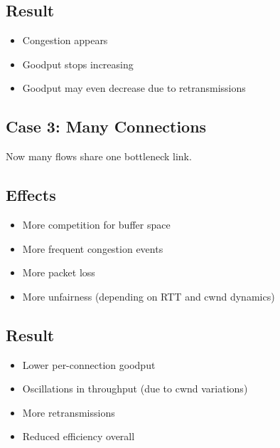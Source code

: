 \subsection*{Result}
\begin{itemize}
    \item Congestion appears
    \item Goodput stops increasing
    \item Goodput may even decrease due to retransmissions
\end{itemize}

\subsection{Case 3: Many Connections}

Now many flows share one bottleneck link.

\subsection*{Effects}
\begin{itemize}
    \item More competition for buffer space
    \item More frequent congestion events
    \item More packet loss
    \item More unfairness (depending on RTT and cwnd dynamics)
\end{itemize}

\subsection*{Result}
\begin{itemize}
    \item Lower per-connection goodput
    \item Oscillations in throughput (due to cwnd variations)
    \item More retransmissions
    \item Reduced efficiency overall
\end{itemize}

